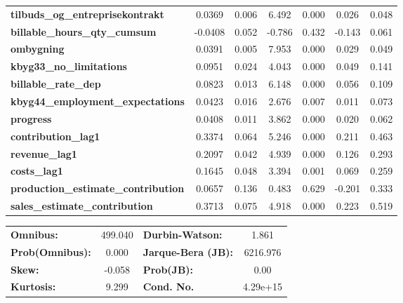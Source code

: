 \begin{center}
\begin{tabular}{lcccccc}
\textbf{tilbuds\_og\_entreprisekontrakt}    &       0.0369  &        0.006     &     6.492  &         0.000        &        0.026    &        0.048     \\
\textbf{billable\_hours\_qty\_cumsum}       &      -0.0408  &        0.052     &    -0.786  &         0.432        &       -0.143    &        0.061     \\
\textbf{ombygning}                          &       0.0391  &        0.005     &     7.953  &         0.000        &        0.029    &        0.049     \\
\textbf{kbyg33\_no\_limitations}            &       0.0951  &        0.024     &     4.043  &         0.000        &        0.049    &        0.141     \\
\textbf{billable\_rate\_dep}                &       0.0823  &        0.013     &     6.148  &         0.000        &        0.056    &        0.109     \\
\textbf{kbyg44\_employment\_expectations}   &       0.0423  &        0.016     &     2.676  &         0.007        &        0.011    &        0.073     \\
\textbf{progress}                           &       0.0408  &        0.011     &     3.862  &         0.000        &        0.020    &        0.062     \\
\textbf{contribution\_lag1}                 &       0.3374  &        0.064     &     5.246  &         0.000        &        0.211    &        0.463     \\
\textbf{revenue\_lag1}                      &       0.2097  &        0.042     &     4.939  &         0.000        &        0.126    &        0.293     \\
\textbf{costs\_lag1}                        &       0.1645  &        0.048     &     3.394  &         0.001        &        0.069    &        0.259     \\
\textbf{production\_estimate\_contribution} &       0.0657  &        0.136     &     0.483  &         0.629        &       -0.201    &        0.333     \\
\textbf{sales\_estimate\_contribution}      &       0.3713  &        0.075     &     4.918  &         0.000        &        0.223    &        0.519     \\
\bottomrule
\end{tabular}
\begin{tabular}{lclc}
\textbf{Omnibus:}       & 499.040 & \textbf{  Durbin-Watson:     } &    1.861  \\
\textbf{Prob(Omnibus):} &   0.000 & \textbf{  Jarque-Bera (JB):  } & 6216.976  \\
\textbf{Skew:}          &  -0.058 & \textbf{  Prob(JB):          } &     0.00  \\
\textbf{Kurtosis:}      &   9.299 & \textbf{  Cond. No.          } & 4.29e+15  \\
\bottomrule
\end{tabular}
\end{center}


